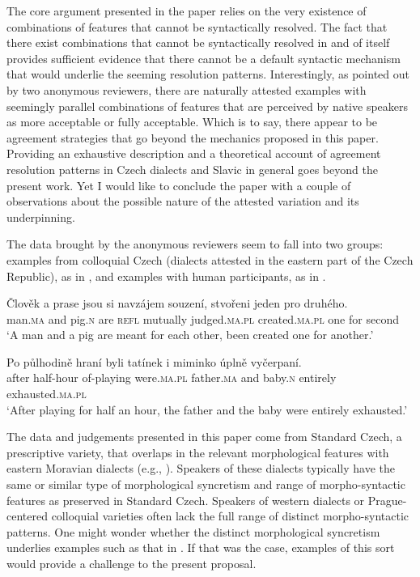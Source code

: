 \documentclass[output=paper,
modfonts
newtxmath,
hidelinks
]{langscibook}
\begin{document}
The core argument presented in the paper relies on the very existence of combinations of features that cannot be syntactically resolved. The fact that there exist combinations that cannot be syntactically resolved in and of itself provides sufficient evidence that there cannot be a default syntactic mechanism that would underlie the seeming resolution patterns. Interestingly, as pointed out by two anonymous reviewers, there are naturally attested examples with seemingly parallel combinations of features that are perceived by native speakers as more acceptable or fully acceptable. Which is to say, there appear to be agreement strategies that go beyond the mechanics proposed in this paper. Providing an exhaustive description and a theoretical account of agreement resolution patterns in Czech dialects and Slavic in general  goes beyond the present work. Yet I would like to conclude the paper with a couple of observations about the possible nature of the attested variation and its underpinning.

The data brought by the anonymous reviewers seem to fall into two groups: examples from colloquial Czech (dialects attested in the eastern part of the Czech Republic), as in , and examples with human participants, as in .

\ea\gll Člověk a prase jsou si navzájem souzení, stvořeni jeden pro druhého.\label{colloq}\\
man.\textsc{ma} and pig.\textsc{n} are \textsc{refl} mutually judged.\textsc{ma.pl} created.\textsc{ma.pl} one for second\\
\glt `A man and a pig are meant for each other, been created one for another.'
\z

\ea\gll Po půlhodině hraní byli tatínek i miminko úplně vyčerpaní.\label{human}\\
after half-hour of-playing were.\textsc{ma.pl} father.\textsc{ma} and baby.\textsc{n} entirely exhausted.\textsc{ma.pl}\\
\glt `After playing for half an hour, the father and the baby were entirely exhausted.'
\z

\noindent The data and judgements presented in this paper come from Standard Czech, a prescriptive variety, that  overlaps in the relevant morphological features with eastern Moravian dialects (e.g., \citealt[401--404]{KarlikEtAl:2002}). Speakers of these dialects typically have the same or similar type of morphological syncretism and range of morpho-syntactic features as preserved in Standard Czech. Speakers of western dialects or Prague-centered colloquial varieties often lack the full range of distinct morpho-syntactic patterns. One might wonder whether the distinct morphological syncretism underlies examples such as that in . If that was the case, examples of this sort would provide a challenge to the present proposal.
\end{document}
